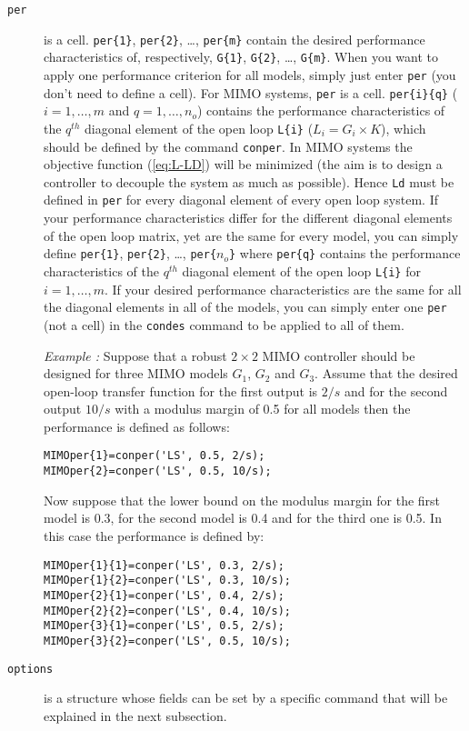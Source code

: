 \documentclass [12pt , a4paper] {report}
\begin{document}
\begin{description}
\item[\texttt{per}] is a cell. \texttt{per\{1\}}, \texttt{per\{2\}}, \dots, \texttt{per\{m\}} contain the desired performance characteristics of, respectively, \texttt{G\{1\}}, \texttt{G\{2\}}, \dots, \texttt{G\{m\}}. When you want to apply one performance criterion for all models, simply just enter \texttt{per} (you don't need to define a cell). For MIMO systems, \texttt{per} is a cell. \texttt{per\{i\}\{q\}} ($i=1,\ldots,m$ and $q=1,\ldots,n_o$) contains the performance characteristics of the $q^{th}$ diagonal element of the open loop \texttt{L\{i\}} ($L_i=G_i \times K$), which should be defined by the  command \texttt{conper}. In MIMO systems the objective function (\ref{eq:L-LD}) will be minimized (the aim is to design a controller to decouple the system as much as possible). Hence \texttt{Ld} must be defined in \texttt{per} for every diagonal element of every open loop system. If your performance characteristics differ for the different diagonal elements of the open loop matrix, yet are the same for every model, you can simply define \texttt{per\{1\}}, \texttt{per\{2\}}, \dots, \texttt{per\{$n_o$\}} where \texttt{per\{q\}} contains the performance characteristics of the $q^{th}$ diagonal element of the open loop \texttt{L\{i\}} for $i=1,\ldots,m$. If your desired performance characteristics are the same for all the diagonal elements in all of the models, you can simply enter one \texttt{per} (not a cell) in the \texttt{condes} command to be applied to all of them.

{\it Example :} Suppose that a robust $2 \times 2$ MIMO controller should be designed for three MIMO models $G_1$, $G_2$ and $G_3$. Assume that the desired open-loop transfer function for the first output is $2/s$ and for the second output $10/s$ with a modulus margin of 0.5 for all models then the performance is defined as follows:
\begin{lstlisting}
MIMOper{1}=conper('LS', 0.5, 2/s);
MIMOper{2}=conper('LS', 0.5, 10/s);
\end{lstlisting}  
Now suppose that the lower bound on the modulus margin for the first model is 0.3, for the second model is 0.4 and for the third one is 0.5. In this case the performance is defined by:
\begin{lstlisting}
MIMOper{1}{1}=conper('LS', 0.3, 2/s);
MIMOper{1}{2}=conper('LS', 0.3, 10/s);
MIMOper{2}{1}=conper('LS', 0.4, 2/s);
MIMOper{2}{2}=conper('LS', 0.4, 10/s);
MIMOper{3}{1}=conper('LS', 0.5, 2/s);
MIMOper{3}{2}=conper('LS', 0.5, 10/s);
\end{lstlisting} 

\item[\texttt{options}] is a structure whose fields can be set by a specific command that will be explained in the next subsection.

\end{description}
\end{document}
